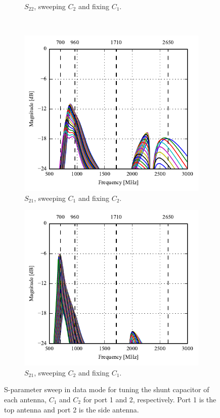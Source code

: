 \begin{figure}[htbp]
\begin{subfigure}[b]{0.49\linewidth}
        \caption{$S_{22}$, sweeping $C_2$ and fixing $C_1$.}
    \end{subfigure}
~
    \begin{subfigure}[b]{0.49\linewidth}
        \centering
        \includegraphics{img/tech_sol/monopole/highband/ue/datamode/s12.pdf}
        \caption{$S_{21}$, sweeping $C_1$ and fixing $C_2$.}
    \end{subfigure}
    \hfill
    \begin{subfigure}[b]{0.49\linewidth}
        \centering
        \includegraphics{img/tech_sol/monopole/highband/ue/datamode/s21.pdf}
        \caption{$S_{21}$, sweeping $C_2$ and fixing $C_1$.}
    \end{subfigure}
    \caption{S-parameter sweep in data mode for tuning the shunt capacitor of each antenna, $C_1$ and $C_2$ for port 1 and 2, respectively. Port 1 is the top antenna and port 2 is the side antenna.}
    \label{fig:sparam_mono_modi_data_mode}
\end{figure}

